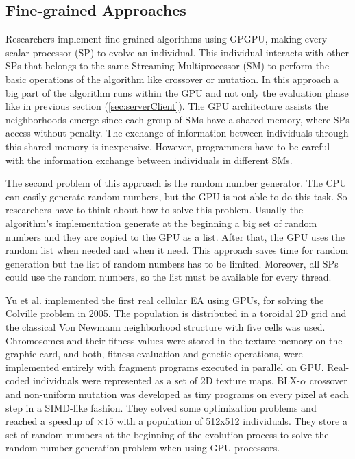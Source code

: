 \documentclass{article}
\begin{document}
\subsection{Fine-grained Approaches}

Researchers implement fine-grained algorithms using GPGPU, making
every scalar processor (SP) to evolve an individual. This individual
interacts with other SPs that belongs to the same Streaming
Multiprocessor (SM) to perform the basic operations of the algorithm
like crossover or mutation. In this approach a big part of the
algorithm runs within the GPU and not only the evaluation phase like
in previous section (\ref{sec:serverClient}). The GPU architecture
assists the neighborhoods emerge since each group of SMs have a shared
memory, where SPs access without penalty. The exchange of information
between individuals through this shared memory is
inexpensive. However, programmers have to be careful with the
information exchange between individuals in different SMs.

The second problem of this approach is the random number
generator. The CPU can easily generate random numbers, but the GPU is
not able to do this task.
So researchers have to think about how to solve this problem. Usually the algorithm's implementation generate at the beginning a big set of random numbers and they are copied to the GPU as a list. After that, the GPU uses the random list when needed and when it need. This approach saves time for random generation but the list of random numbers has to be limited. Moreover, all SPs could use the random numbers, so the list must be available for every
thread.


Yu et al. \cite{yu-parallel-2005} implemented the first real cellular EA using GPUs, for solving the Colville problem \cite{Ng:2005:DFF:1064290.1064296} in 2005. The population is distributed in a toroidal 2D grid and the classical Von Newmann neighborhood structure with five cells was used. Chromosomes and their fitness values were stored in the texture memory on the graphic card, and both, fitness evaluation and genetic operations, were implemented entirely with fragment programs executed in parallel on GPU. Real-coded individuals were represented as a set of 2D texture maps. BLX-$\alpha$ crossover and non-uniform mutation was developed as tiny programs on every pixel at each step in a SIMD-like fashion. They solved some optimization problems and reached a speedup of $\times15$ with a population of 512x512 individuals. They store a set of random numbers at the beginning of the evolution process to solve the random number generation problem when using GPU processors.
\end{document}
